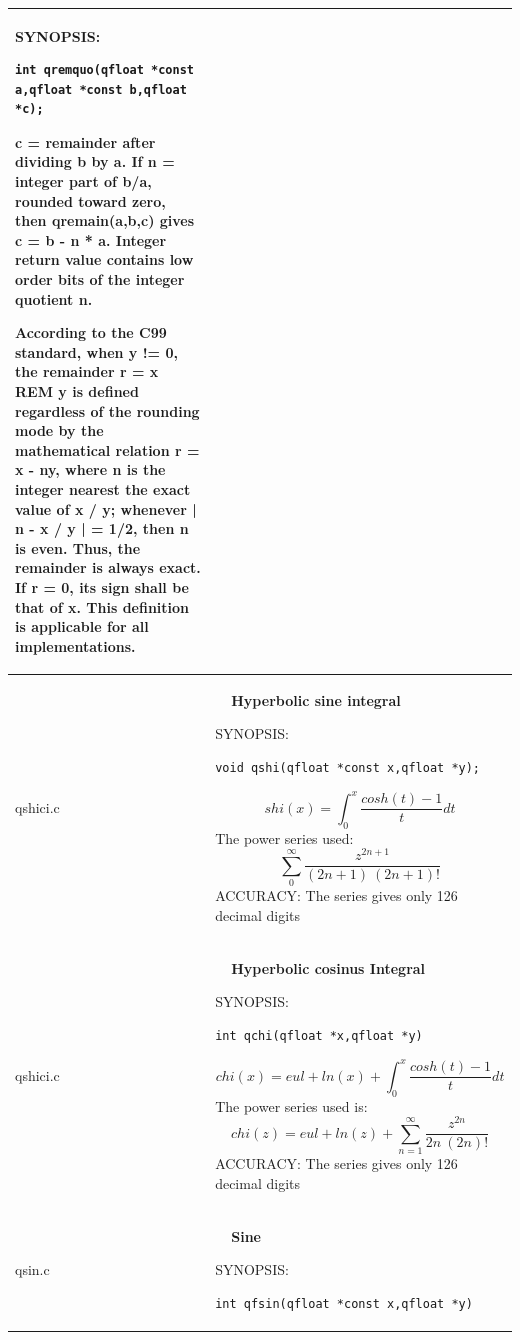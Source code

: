 \documentclass[10pt,a4paper,x11names]{memoir} %
\newcounter{entry}
\newcommand{\TOC}[1] {\addcontentsline{toc}{section}{\theentry\ \  #1} \textbf{\theentry\ \  #1} \par\stepcounter{entry}}
\begin{document}
\begin{longtable}{|p{1.5cm}|p{11.5cm}|}
	{\footnotesize SYNOPSIS:}\vspace{-0.2cm}\index{qremquo}
	\begin{lstlisting}[numbers=none]
		int qremquo(qfloat *const a,qfloat *const b,qfloat *c);
	\end{lstlisting}\vspace{-0.2cm}
	c = remainder after dividing b by a.
	If n = integer part of b/a, rounded toward zero,
	then qremain(a,b,c) gives c = b - n * a.
	Integer return value contains low order bits of the integer quotient n.
	
	According to the C99 standard,
	when y != 0, the remainder r = x REM y is defined regardless
	of the rounding mode by the mathematical relation r = x - ny,
	where n is the integer nearest the exact value of x / y;
	whenever | n - x / y | = 1/2, then n is even. Thus, the remainder
	is always exact. If r = 0, its sign shall be that of x.
	This definition is applicable for all implementations.
	\\\hline
	qshici.c& \TOC{Hyperbolic sine integral}
	
	{\footnotesize SYNOPSIS:}\vspace{-0.2cm}\index{qshi}
	\begin{lstlisting}[numbers=none]
		void qshi(qfloat *const x,qfloat *y);
	\end{lstlisting}\vspace{-0.2cm}
	$$shi(x)=\int_{0}^{x} \frac{cosh(t)-1}{t} dt$$
	The power series used:
	$$\sum_{0}^{\infty}\frac{z^{2n+1}}{(2n+1)\ (2n+1)!}$$
	{\footnotesize ACCURACY:} The series gives only 126 decimal digits
	\\\hline
	
	qshici.c & \TOC{Hyperbolic cosinus Integral}
	
	{\footnotesize SYNOPSIS:}\vspace{-0.2cm}\index{qchi}
	\begin{lstlisting}[numbers=none]
		int qchi(qfloat *x,qfloat *y)
	\end{lstlisting}\vspace{-0.2cm}
	$$chi(x)=eul + ln(x) + \int_{0}^{x} \frac{cosh(t)-1}{t} dt$$
	The power series used is:
	$$ chi(z)=eul+ln(z)+\sum_{n=1}^{\infty}\frac{z^{2n}}{2n \ (2n)!}$$
	{\footnotesize ACCURACY:} The series gives only 126 decimal digits
	\\\hline
	qsin.c & \TOC{Sine}
	
	{\footnotesize SYNOPSIS:}\vspace{-0.2cm}\index{qfsin}
	\begin{lstlisting}[numbers=none]
		int qfsin(qfloat *const x,qfloat *y)
	\end{lstlisting}\vspace{-0.2cm}
	

\end{longtable}
\end{document}
